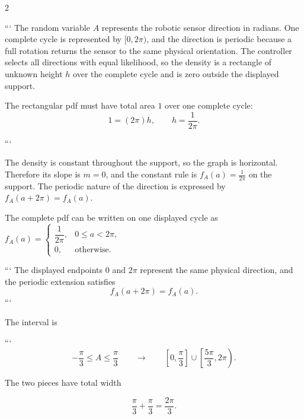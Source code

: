 	\setlength{\columnseprule}{0.4pt}
	\begin{multicols}{2}
		
		```
		The random variable $A$ represents the robotic sensor direction in radians.
		One complete cycle is represented by $[0,2\pi)$, and the direction is
		periodic because a full rotation returns the sensor to the same physical
		orientation. The controller selects all directions with equal likelihood,
		so the density is a rectangle of unknown height $h$ over the complete cycle
		and is zero outside the displayed support.
		
		
		\columnbreak
		
		The rectangular pdf must have total area $1$ over one complete cycle:
		\[
		1=(2\pi)h,
		\qquad
		h=\frac1{2\pi}.
		\]
		
		```
		
	\end{multicols}
	\setlength{\columnseprule}{0pt}
	
	The density is constant throughout the support, so the graph is horizontal.
	Therefore its slope is $m=0$, and the constant rule is
	$f_A(a)=\frac1{2\pi}$ on the support. The periodic nature of the direction
	is expressed by
	$f_A(a+2\pi)=f_A(a)$.
	
	The complete pdf can be written on one displayed cycle as
	\(
	f_A(a)=
	\begin{cases}
		\dfrac1{2\pi},&0\le a<2\pi,\\[1mm]
		0,&\text{otherwise}.
	\end{cases}
	\)
	
	```
	The displayed endpoints $0$ and $2\pi$ represent the same physical
	direction, and the periodic extension satisfies
	\[
	f_A(a+2\pi)=f_A(a).
	\]
	```
	
	The interval is
	
	```
	$$
	-\frac{\pi}{3}\le A\le\frac{\pi}{3}
	\qquad\longrightarrow\qquad
	\left[0,\frac{\pi}{3}\right]\cup
	\left[\frac{5\pi}{3},2\pi\right).
	$$
	
	The two pieces have total width
	
	$$
	\frac{\pi}{3}+\frac{\pi}{3}
	=\frac{2\pi}{3}.
	$$
	
